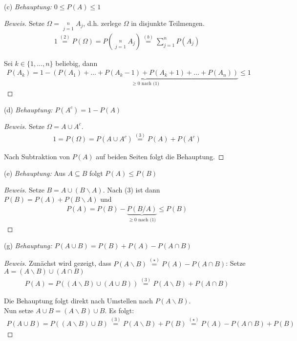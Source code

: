 \documentclass[10pt]{article}
\begin{document}
(c) \textit{Behauptung: $0 \leq P(A) \leq 1$}
\begin{proof}[Beweis]
Setze $\Omega = \mathop{\dot\bigcup}\limits_{j=1}^{n} A_j$, d.h. zerlege $\Omega$ in disjunkte Teilmengen. 
\begin{align*}
    1 \stackrel{(2)}{=} P(\Omega) = P\left( \mathop{\dot\bigcup}\limits_{j=1}^{n} A_j \right) \stackrel{(b)}{=} \sum\limits_{j=1}^{n} P(A_j)
\end{align*}

Sei $k\in\{1,...,n\}$ beliebig, dann
\begin{align*}
    P(A_k) = 1 - \underbrace{(P(A_1) +...+ P(A_k-1) + P(A_k+1) +...+ P(A_n))}_\text{$\geq 0$ nach (1)} \leq 1
\end{align*}

\end{proof}

(d) \textit{Behauptung: $P(A^c) = 1 - P(A)$}
\begin{proof}[Beweis]
Setze $\Omega = A \cup A^c$. 
\begin{align*}
    1 = P(\Omega) = P(A \cup A^c) \stackrel{(3)}{=} P(A) + P(A^c)
\end{align*}

Nach Subtraktion von $P(A)$ auf beiden Seiten folgt die Behauptung.

\end{proof}

(e) \textit{Behauptung: } Aus $A \subseteq B$ folgt $P(A) \leq P(B)$
\begin{proof}[Beweis]
Setze $B = A \cup (B\backslash A)$. Nach (3) ist dann $P(B) = P(A) + P(B\backslash A)$ und 
\begin{align*}
    P(A) = P(B) - \underbrace{P(B/A)}_\text{$\geq 0$ nach (1)} \leq P(B)
\end{align*}

\end{proof}

(g) \textit{Behauptung: $P(A \cup B) = P(B) + P(A) - P(A \cap B)$}
\begin{proof}[Beweis]
Zunächst wird gezeigt, dass $P(A\backslash B) \stackrel{(\star)}{=} P(A) - P(A \cap B)$: Setze $A = (A\backslash B) \cup (A \cap B)$
\begin{align*}
    P(A) = P((A\backslash B)\cup(A \cup B)) \stackrel{(3)}{=} P(A\backslash B) + P(A\cap B)
\end{align*}

Die Behauptung folgt direkt nach Umstellen nach $P(A\backslash B)$. \\
Nun setze $A\cup B = (A\backslash B) \cup B$. Es folgt:
\begin{align*}
    P(A \cup B) = P((A\backslash B) \cup B) \stackrel{(3)}{=} P(A\backslash B) + P(B) \stackrel{(\star)}{=} P(A) - P(A \cap B) + P(B)
\end{align*}

\end{proof}
\end{document}

